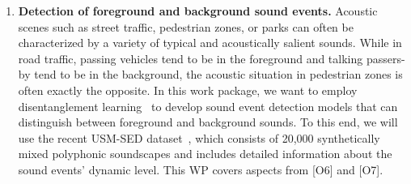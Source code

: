 \documentclass[11pt,a4paper]{article}
\newcommand{\jakob}[1]{{\color{magenta} #1}}
\theoremstyle{plain} \newtheorem{define}{Definition}[section]
\begin{document}
{\begin{enumerate}[itemindent=0.5cm]
\item  \label{WI:SEDforback}
\textbf{Detection of foreground and background sound events.} 
%
%
Acoustic scenes such as street traffic, pedestrian zones, or parks can often be characterized by a variety of typical and acoustically salient sounds. 
While in road traffic, passing vehicles tend to be in the foreground and talking passers-by tend to be in the background, the acoustic situation in pedestrian zones is often exactly the opposite. 
%
In this work package, we want to employ disentanglement learning~\cite{Lee:2020:Disentangle:ISMIR,Veit:2017:CSN:ARXIV} to develop sound event detection models that can distinguish between foreground and background sounds.
%
To this end, we will use the recent USM-SED dataset~\cite{Abesser:2021:USM-SED:ARXIV}, which consists of 20,000 synthetically mixed polyphonic soundscapes and includes detailed information about the sound events' dynamic level. 
%
%
This WP covers aspects from [O6] and [O7].


\end{enumerate}}
\end{document}
